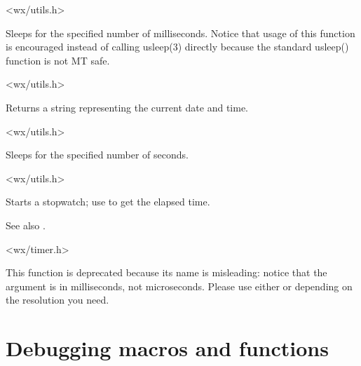 
<wx/utils.h>


\label{wxmillisleep}


Sleeps for the specified number of milliseconds. Notice that usage of this
function is encouraged instead of calling usleep(3) directly because the
standard usleep() function is not MT safe.


<wx/utils.h>


\label{wxnow}


Returns a string representing the current date and time.


<wx/utils.h>


\label{wxsleep}


Sleeps for the specified number of seconds.


<wx/utils.h>


\label{wxstarttimer}


Starts a stopwatch; use  to get the elapsed time.

See also .


<wx/timer.h>


\label{wxusleep}


This function is deprecated because its name is misleading: notice that the
argument is in milliseconds, not microseconds. Please use either 
 or  
depending on the resolution you need.



\section{Debugging macros and functions}\label{debugmacros}

